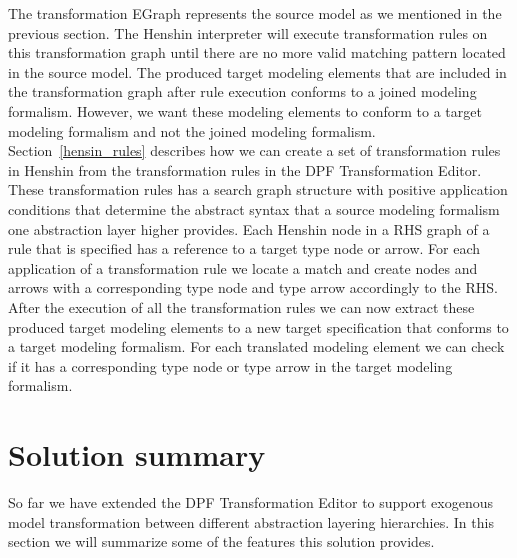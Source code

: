 The transformation EGraph represents the source model as we mentioned in the
previous section. The Henshin interpreter will execute transformation rules on
this transformation graph until there are no more valid matching pattern located
in the source model. The produced target modeling elements that are included in
the transformation graph after rule execution conforms to a joined modeling
formalism. However, we want these modeling elements to conform to a target
modeling formalism and not the joined modeling formalism.
Section~\ref{hensin_rules} describes how we can create a set of transformation
rules in Henshin from the transformation rules in the DPF Transformation Editor.
These transformation rules has a search graph structure with positive
application conditions that determine the abstract syntax that a source
modeling formalism one abstraction layer higher provides. Each Henshin node in a
RHS graph of a rule that is specified has a reference to a target type node or
arrow. For each application of a transformation rule we locate a match and
create nodes and arrows with a corresponding type node and type arrow
accordingly to the RHS. After the execution of all the transformation rules we
can now extract these produced target modeling elements to a new target
specification that conforms to a target modeling formalism. For each translated
modeling element we can check if it has a corresponding type node or type arrow
in the target modeling formalism. 

\section{Solution summary}

So far we have extended the DPF Transformation Editor to support exogenous model
transformation between different abstraction layering hierarchies. In this
section we will summarize some of the features this solution provides.

